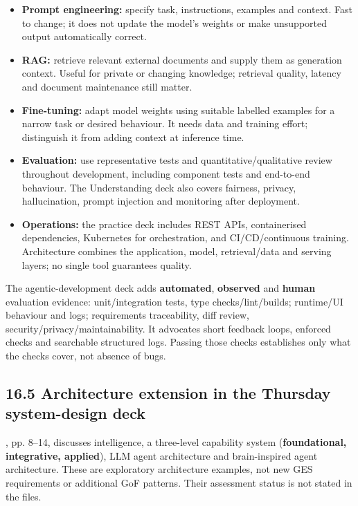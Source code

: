 \begin{studycolumns}
\begin{itemize}
\item \textbf{Prompt engineering:} specify task, instructions, examples and context. Fast to change; it does not update the model's weights or make unsupported output automatically correct.
\item \textbf{RAG:} retrieve relevant external documents and supply them as generation context. Useful for private or changing knowledge; retrieval quality, latency and document maintenance still matter.
\item \textbf{Fine-tuning:} adapt model weights using suitable labelled examples for a narrow task or desired behaviour. It needs data and training effort; distinguish it from adding context at inference time.
\item \textbf{Evaluation:} use representative tests and quantitative/\allowbreak{}qualitative review throughout development, including component tests and end-to-end behaviour. The Understanding deck also covers fairness, privacy, hallucination, prompt injection and monitoring after deployment.
\item \textbf{Operations:} the practice deck includes REST APIs, containerised dependencies, Kubernetes for orchestration, and CI/\allowbreak{}CD/\allowbreak{}continuous training. Architecture combines the application, model, retrieval/\allowbreak{}data and serving layers; no single tool guarantees quality.
\end{itemize}
The agentic-development deck adds \textbf{automated}, \textbf{observed} and \textbf{human} evaluation evidence: unit/\allowbreak{}integration tests, type checks/\allowbreak{}lint/\allowbreak{}builds; runtime/\allowbreak{}UI behaviour and logs; requirements traceability, diff review, security/\allowbreak{}privacy/\allowbreak{}maintainability. It advocates short feedback loops, enforced checks and searchable structured logs. Passing those checks establishes only what the checks cover, not absence of bugs.

\subsection*{16.5 Architecture extension in the Thursday system-design deck}
, pp. 8--14, discusses intelligence, a three-level capability system (\textbf{foundational, integrative, applied}), LLM agent architecture and brain-inspired agent architecture. These are exploratory architecture examples, not new GES requirements or additional GoF patterns. Their assessment status is not stated in the files.
\end{studycolumns}
